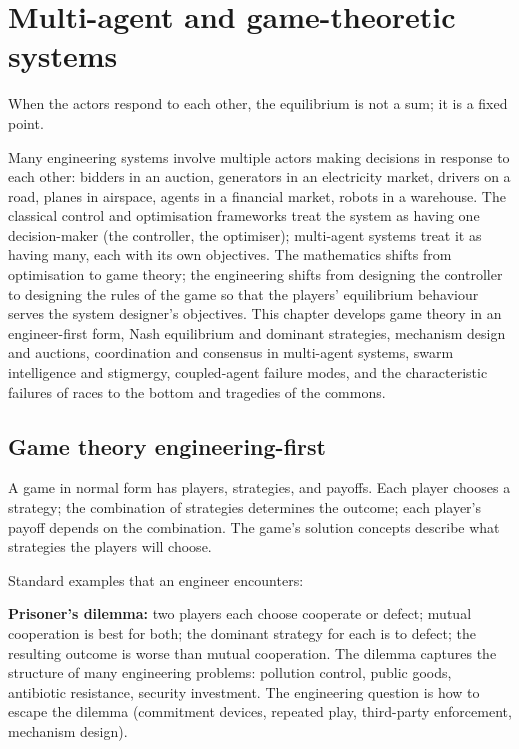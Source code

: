 \chapter{Multi-agent and game-theoretic systems}
\label{vol09:ch12}

\epigraph{When the actors respond to each other, the equilibrium is not a sum; it is a fixed point.}{}


\noindent
Many engineering systems involve multiple actors making decisions in response to each other: bidders in an auction, generators in an electricity market, drivers on a road, planes in airspace, agents in a financial market, robots in a warehouse. The classical control and optimisation frameworks treat the system as having one decision-maker (the controller, the optimiser); multi-agent systems treat it as having many, each with its own objectives. The mathematics shifts from optimisation to game theory; the engineering shifts from designing the controller to designing the rules of the game so that the players' equilibrium behaviour serves the system designer's objectives. This chapter develops game theory in an engineer-first form, Nash equilibrium and dominant strategies, mechanism design and auctions, coordination and consensus in multi-agent systems, swarm intelligence and stigmergy, coupled-agent failure modes, and the characteristic failures of races to the bottom and tragedies of the commons.

\section{Game theory engineering-first}

A game in normal form has players, strategies, and payoffs. Each player chooses a strategy; the combination of strategies determines the outcome; each player's payoff depends on the combination. The game's solution concepts describe what strategies the players will choose.

Standard examples that an engineer encounters:

\textbf{Prisoner's dilemma:} two players each choose cooperate or defect; mutual cooperation is best for both; the dominant strategy for each is to defect; the resulting outcome is worse than mutual cooperation. The dilemma captures the structure of many engineering problems: pollution control, public goods, antibiotic resistance, security investment. The engineering question is how to escape the dilemma (commitment devices, repeated play, third-party enforcement, mechanism design).

